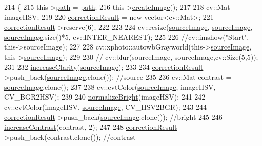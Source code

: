 \begin{DoxyCode}
214 \{
215     this->\hyperlink{class_correction_a6e1ccea5c33ea89d717d9227d17f625c}{path} = \hyperlink{class_correction_a6e1ccea5c33ea89d717d9227d17f625c}{path};
216     this->\hyperlink{class_correction_addd8e0c7fbc69b9ba791d80659539731}{createImage}();
217 
218     cv::Mat imageHSV;
219 
220     \hyperlink{class_correction_a02fff781df4df45a3bb6f0a2484cafcc}{correctionResult} = \textcolor{keyword}{new} vector<cv::Mat>;
221     \hyperlink{class_correction_a02fff781df4df45a3bb6f0a2484cafcc}{correctionResult}->reserve(6);
222 
223 
224     cv::resize(\hyperlink{class_correction_a1344ad4fb7d6a6346c2524e06feddd4b}{sourceImage}, \hyperlink{class_correction_a1344ad4fb7d6a6346c2524e06feddd4b}{sourceImage}, \hyperlink{class_correction_a1344ad4fb7d6a6346c2524e06feddd4b}{sourceImage}.size()*5,
      cv::INTER\_NEAREST);
225 
226     \textcolor{comment}{//cv::imshow("Start", this->sourceImage);}
227 
228     cv::xphoto::autowbGrayworld(this->\hyperlink{class_correction_a1344ad4fb7d6a6346c2524e06feddd4b}{sourceImage}, this->\hyperlink{class_correction_a1344ad4fb7d6a6346c2524e06feddd4b}{sourceImage});
229 
230 \textcolor{comment}{//    cv::blur(sourceImage, sourceImage,cv::Size(5,5));}
231 
232     \hyperlink{class_correction_ae9b87cadf876be9832d886fb44d913f2}{increaseClarity}(\hyperlink{class_correction_a1344ad4fb7d6a6346c2524e06feddd4b}{sourceImage});
233 
234     \hyperlink{class_correction_a02fff781df4df45a3bb6f0a2484cafcc}{correctionResult}->push\_back(\hyperlink{class_correction_a1344ad4fb7d6a6346c2524e06feddd4b}{sourceImage}.clone()); \textcolor{comment}{//source}
235 
236     cv::Mat contrast = \hyperlink{class_correction_a1344ad4fb7d6a6346c2524e06feddd4b}{sourceImage}.clone();
237 
238     cv::cvtColor(\hyperlink{class_correction_a1344ad4fb7d6a6346c2524e06feddd4b}{sourceImage}, imageHSV, CV\_BGR2HSV);
239 
240     \hyperlink{class_correction_a80784bcdd2ac906f3c06713540cc5a0c}{normalizeBright}(imageHSV);
241 
242     cv::cvtColor(imageHSV, \hyperlink{class_correction_a1344ad4fb7d6a6346c2524e06feddd4b}{sourceImage}, CV\_HSV2BGR);
243 
244     \hyperlink{class_correction_a02fff781df4df45a3bb6f0a2484cafcc}{correctionResult}->push\_back(\hyperlink{class_correction_a1344ad4fb7d6a6346c2524e06feddd4b}{sourceImage}.clone()); \textcolor{comment}{//bright}
245 
246     \hyperlink{class_correction_adfc060f705da270932f1a8adec8ce567}{increaseContrast}(contrast, 2);
247 
248     \hyperlink{class_correction_a02fff781df4df45a3bb6f0a2484cafcc}{correctionResult}->push\_back(contrast.clone()); \textcolor{comment}{//contrast}

\end{DoxyCode}
